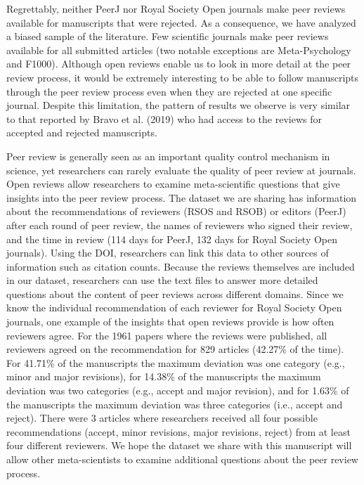 \documentclass[
  english,
  ,jou, a4paper,floatsintext]{apa6}
\begin{document}
Regrettably, neither PeerJ nor Royal Society Open journals make peer reviews available for manuscripts that were rejected. As a consequence, we have analyzed a biased sample of the literature. Few scientific journals make peer reviews available for all submitted articles (two notable exceptions are Meta-Psychology and F1000). Although open reviews enable us to look in more detail at the peer review process, it would be extremely interesting to be able to follow manuscripts through the peer review process even when they are rejected at one specific journal. Despite this limitation, the pattern of results we observe is very similar to that reported by Bravo et al. (2019) who had access to the reviews for accepted and rejected manuscripts.

Peer review is generally seen as an important quality control mechanism in science, yet researchers can rarely evaluate the quality of peer review at journals. Open reviews allow researchers to examine meta-scientific questions that give insights into the peer review process. The dataset we are sharing has information about the recommendations of reviewers (RSOS and RSOB) or editors (PeerJ) after each round of peer review, the names of reviewers who signed their review, and the time in review (114 days for PeerJ, 132 days for Royal Society Open journals). Using the DOI, researchers can link this data to other sources of information such as citation counts. Because the reviews themselves are included in our dataset, researchers can use the text files to answer more detailed questions about the content of peer reviews across different domains. Since we know the individual recommendation of each reviewer for Royal Society Open journals, one example of the insights that open reviews provide is how often reviewers agree. For the 1961 papers where the reviews were published, all reviewers agreed on the recommendation for 829 articles (42.27\% of the time). For 41.71\% of the manuscripts the maximum deviation was one category (e.g., minor and major revisions), for 14.38\% of the manuscripts the maximum deviation was two categories (e.g., accept and major revision), and for 1.63\% of the manuscripts the maximum deviation was three categories (i.e., accept and reject). There were 3 articles where researchers received all four possible recommendations (accept, minor revisions, major revisions, reject) from at least four different reviewers. We hope the dataset we share with this manuscript will allow other meta-scientists to examine additional questions about the peer review process.
\end{document}
